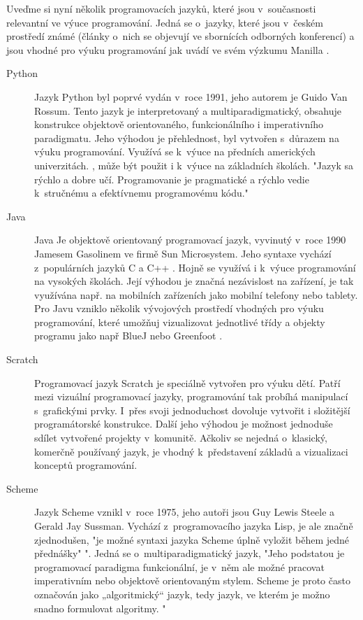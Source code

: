 \documentclass[FP,DP]{tulthesis}
\begin{document}
{{{{{{{\vspace{2mm}Uveďme si nyní několik programovacích jazyků, které jsou v~současnosti relevantní ve výuce programování. Jedná se o~jazyky, které jsou v~českém prostředí známé (články o~nich se objevují ve sbornících odborných konferencí) a jsou vhodné pro výuku programování jak uvádí ve svém výzkumu Manilla  \citeyearpar{mannila}. 
\begin{description}
\item [Python] Jazyk Python byl poprvé vydán v~roce 1991, jeho autorem je Guido Van Rossum. Tento jazyk je interpretovaný a multiparadigmatický, obsahuje konstrukce objektově orientovaného, funkcionálního i imperativního paradigmatu. Jeho výhodou je přehlednost, byl vytvořen s~důrazem na výuku programování. Využívá se k~výuce na předních amerických univerzitách\citeyearpar{guo_2014}. , může být použit i k~výuce na základních školách. "Jazyk sa rýchlo a dobre učí. Programovanie je pragmatické a rýchlo vedie k~stručnému a efektívnemu programovému kódu." \citep{hajek2015}
\item [Java] Java Je objektově orientovaný programovací jazyk, vyvinutý v~roce 1990 Jamesem Gasolinem ve firmě Sun Microsystem. Jeho syntaxe vychází z~populárních jazyků C a C++  \citep{javamanual}. Hojně se využívá i k~výuce programování na vysokých školách. Její výhodou je značná nezávislost na zařízení, je tak využívána např. na mobilních zařízeních jako mobilní telefony nebo tablety. Pro Javu vzniklo několik vývojových prostředí vhodných pro výuku programování, které umožňuj vizualizovat jednotlivé třídy a objekty programu jako např BlueJ  \citep{bluej} nebo Greenfoot \citep{greenfoot}.  
\item [Scratch] Programovací jazyk Scratch je speciálně vytvořen pro výuku dětí. Patří mezi vizuální programovací jazyky, programování tak probíhá manipulací s~grafickými prvky. I~přes svoji jednoduchost dovoluje vytvořit i složitější programátorské konstrukce. Další jeho výhodou je možnost jednoduše sdílet vytvořené projekty v~komunitě. Ačkoliv se nejedná o~klasický, komerčně používaný jazyk, je vhodný k~představení základů a vizualizaci konceptů programování.\citep{scratch}
\item [Scheme] Jazyk Scheme vznikl v~roce 1975, jeho autoři jsou Guy Lewis Steele a Gerald Jay Sussman. Vychází z~programovacího jazyka Lisp, je ale značně zjednodušen,  "je možné syntaxi jazyka Scheme úplně vyložit během jedné přednášky" \citep[s. 11]{scheme}". Jedná se o~multiparadigmatický jazyk, "Jeho podstatou je programovací paradigma funkcionální, je v~něm ale možné pracovat imperativním nebo objektově orientovaným stylem. Scheme je proto často označován jako „algoritmický“ jazyk, tedy jazyk, ve kterém je možno snadno formulovat algoritmy. \citep[s. 10]{scheme}"
\end{description}

}}}}}}}
\end{document}
